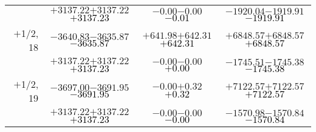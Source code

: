 \documentclass[compress]{beamer}
\begin{document}
\begin{frame}
{\begin{tabular}{r | c | c | c}
           & $+3137.22$\hspace{0.1 cm}$+3137.22$\hspace{0.1 cm}\textcolor{black}{$+3137.23$} & $-0.00$\hspace{0.1 cm}$-0.00$\hspace{0.1 cm}\textcolor{black}{$-0.01$} & $-1920.04$\hspace{0.1 cm}$-1919.91$\hspace{0.1 cm}\textcolor{black}{$-1919.91$} \\
$+$1/2, 18 & $-3640.83$\hspace{0.1 cm}$-3635.87$\hspace{0.1 cm}\textcolor{black}{$-3635.87$} & $+641.98$\hspace{0.1 cm}$+642.31$\hspace{0.1 cm}\textcolor{black}{$+642.31$} & $+6848.57$\hspace{0.1 cm}$+6848.57$\hspace{0.1 cm}\textcolor{black}{$+6848.57$} \\
           & $+3137.22$\hspace{0.1 cm}$+3137.22$\hspace{0.1 cm}\textcolor{black}{$+3137.23$} & $-0.00$\hspace{0.1 cm}$-0.00$\hspace{0.1 cm}\textcolor{black}{$+0.00$} & $-1745.51$\hspace{0.1 cm}$-1745.38$\hspace{0.1 cm}\textcolor{black}{$-1745.38$} \\
$+$1/2, 19 & $-3697.00$\hspace{0.1 cm}$-3691.95$\hspace{0.1 cm}\textcolor{black}{$-3691.95$} & $-0.00$\hspace{0.1 cm}$+0.32$\hspace{0.1 cm}\textcolor{black}{$+0.32$} & $+7122.57$\hspace{0.1 cm}$+7122.57$\hspace{0.1 cm}\textcolor{black}{$+7122.57$} \\
           & $+3137.22$\hspace{0.1 cm}$+3137.22$\hspace{0.1 cm}\textcolor{black}{$+3137.23$} & $-0.00$\hspace{0.1 cm}$-0.00$\hspace{0.1 cm}\textcolor{black}{$-0.00$} & $-1570.98$\hspace{0.1 cm}$-1570.84$\hspace{0.1 cm}\textcolor{black}{$-1570.84$} \\

\end{tabular}}
\end{frame}
\end{document}
